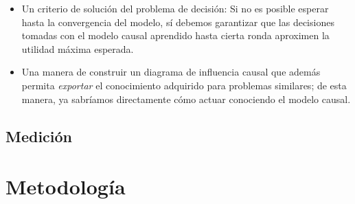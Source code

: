 \documentclass[11pt]{article}
\theoremstyle{plain}
\begin{document}
\begin{itemize}
\item Un criterio de solución del problema de decisión: Si no es posible esperar hasta la convergencia del modelo, sí debemos garantizar que las decisiones tomadas con el modelo causal aprendido hasta cierta ronda aproximen la utilidad máxima esperada.

\item Una manera de construir un diagrama de influencia causal que además permita \textit{exportar} el conocimiento adquirido para problemas similares; de esta manera, ya sabríamos directamente cómo actuar conociendo el modelo causal.

\end{itemize}
\subsection{Medición}
\section{Metodología}
\end{document}
